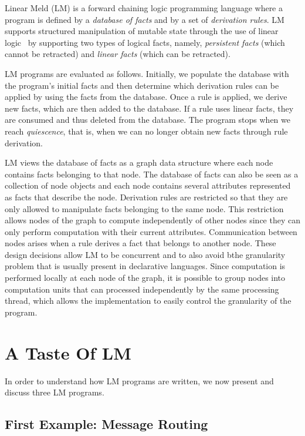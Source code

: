 
Linear Meld (LM) is a forward chaining logic programming language where a
program is defined by a \emph{database of facts} and by a set of
\emph{derivation rules}. LM supports structured manipulation of mutable state
through the use of linear logic~\cite{girard-87} by supporting two types of
logical facts, namely, \emph{persistent facts} (which cannot be retracted) and
\emph{linear facts} (which can be retracted).

LM programs are evaluated as follows. Initially, we populate the database with
the program's initial facts and then determine which derivation rules can be
applied by using the facts from the database. Once a rule is applied, we derive
new facts, which are then added to the database. If a rule uses linear facts,
they are consumed and thus deleted from the database. The program stops when we
reach \emph{quiescence}, that is, when we can no longer obtain new facts through
rule derivation.

LM views the database of facts as a graph data structure where each node contains
facts belonging to that node. The database of facts can also be seen as a
collection of node objects and each node contains several attributes represented
as facts that describe the node. Derivation rules are restricted so that they
are only allowed to manipulate facts belonging to the same node. This
restriction allows nodes of the graph to compute independently of other nodes
since they can only perform computation with their current attributes.
Communication between nodes arises when a rule derives a fact that belongs to
another node. These design decisions allow LM to be concurrent and to also avoid
bthe granularity problem that is usually present in declarative languages. Since
computation is performed locally at each node of the graph, it is possible to
group nodes into computation units that can processed independently by the same
processing thread, which allows the implementation to easily control the
granularity of the program.

\section{A Taste Of LM}

In order to understand how LM programs are written, we now present and discuss
three LM programs.

\subsection{First Example: Message Routing}\label{section:language:message}


